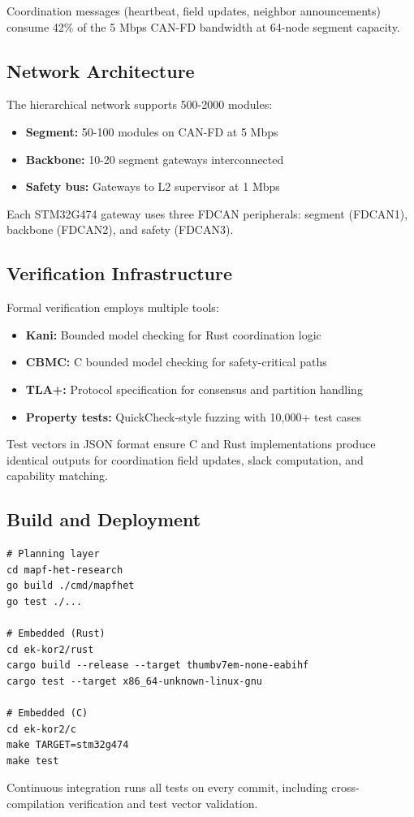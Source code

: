 Coordination messages (heartbeat, field updates, neighbor announcements) consume 42\% of the 5 Mbps CAN-FD bandwidth at 64-node segment capacity.

\subsection{Network Architecture}

The hierarchical network supports 500-2000 modules:
\begin{itemize}
    \item \textbf{Segment:} 50-100 modules on CAN-FD at 5 Mbps
    \item \textbf{Backbone:} 10-20 segment gateways interconnected
    \item \textbf{Safety bus:} Gateways to L2 supervisor at 1 Mbps
\end{itemize}

Each STM32G474 gateway uses three FDCAN peripherals: segment (FDCAN1), backbone (FDCAN2), and safety (FDCAN3).

\subsection{Verification Infrastructure}

Formal verification employs multiple tools:
\begin{itemize}
    \item \textbf{Kani:} Bounded model checking for Rust coordination logic
    \item \textbf{CBMC:} C bounded model checking for safety-critical paths
    \item \textbf{TLA+:} Protocol specification for consensus and partition handling
    \item \textbf{Property tests:} QuickCheck-style fuzzing with 10,000+ test cases
\end{itemize}

Test vectors in JSON format ensure C and Rust implementations produce identical outputs for coordination field updates, slack computation, and capability matching.

\subsection{Build and Deployment}

\begin{verbatim}
# Planning layer
cd mapf-het-research
go build ./cmd/mapfhet
go test ./...

# Embedded (Rust)
cd ek-kor2/rust
cargo build --release --target thumbv7em-none-eabihf
cargo test --target x86_64-unknown-linux-gnu

# Embedded (C)
cd ek-kor2/c
make TARGET=stm32g474
make test
\end{verbatim}

Continuous integration runs all tests on every commit, including cross-compilation verification and test vector validation.
